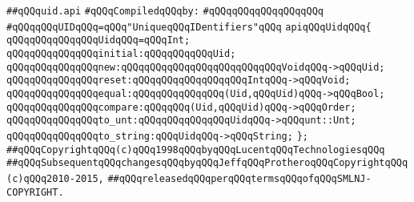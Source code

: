 \label{src/lib/c-kit/src/ast/uid.api}
\verb|##qQQquid.api|\newline
\newline
\verb|#qQQqCompiledqQQqby:|\newline
\verb|#qQQqqQQqqQQqqQQqqQQq|\newline
\newline
\verb|#qQQqqQQqUIDqQQq=qQQq"UniqueqQQqIDentifiers"qQQq|\newline
\newline
\verb|apiqQQqUidqQQq{|\newline
\newline
\verb|qQQqqQQqqQQqqQQqUidqQQq=qQQqInt;|\newline
\newline
\verb|qQQqqQQqqQQqqQQqinitial:qQQqqQQqqQQqUid;|\newline
\verb|qQQqqQQqqQQqqQQqnew:qQQqqQQqqQQqqQQqqQQqqQQqqQQqVoidqQQq->qQQqUid;|\newline
\verb|qQQqqQQqqQQqqQQqreset:qQQqqQQqqQQqqQQqqQQqIntqQQq->qQQqVoid;|\newline
\verb|qQQqqQQqqQQqqQQqequal:qQQqqQQqqQQqqQQq(Uid,qQQqUid)qQQq->qQQqBool;|\newline
\verb|qQQqqQQqqQQqqQQqcompare:qQQqqQQq(Uid,qQQqUid)qQQq->qQQqOrder;|\newline
\verb|qQQqqQQqqQQqqQQqto_unt:qQQqqQQqqQQqqQQqUidqQQq->qQQqunt::Unt;|\newline
\verb|qQQqqQQqqQQqqQQqto_string:qQQqUidqQQq->qQQqString;|\newline
\verb|};|\newline
\newline
\newline
\verb|##qQQqCopyrightqQQq(c)qQQq1998qQQqbyqQQqLucentqQQqTechnologiesqQQq|\newline
\verb|##qQQqSubsequentqQQqchangesqQQqbyqQQqJeffqQQqProtheroqQQqCopyrightqQQq(c)qQQq2010-2015,|\newline
\verb|##qQQqreleasedqQQqperqQQqtermsqQQqofqQQqSMLNJ-COPYRIGHT.|\newline

